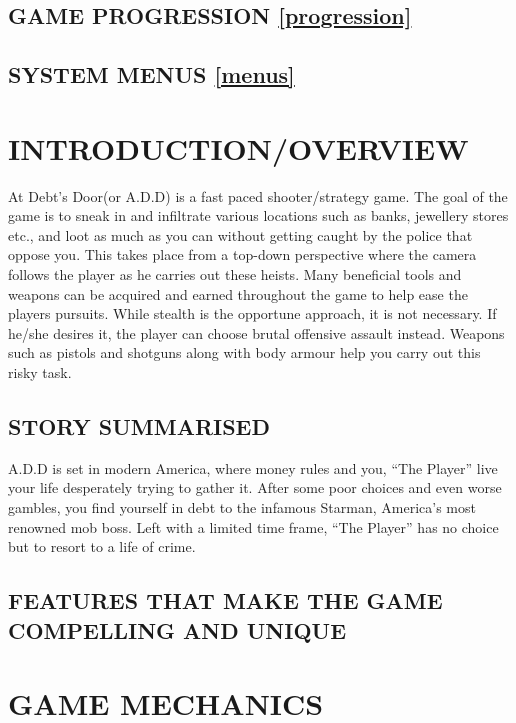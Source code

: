\documentclass{article}
\begin{document}
%

\subsection{GAME PROGRESSION \ref{progression}}

%

\subsection{SYSTEM MENUS \ref{menus}}


\section{INTRODUCTION/OVERVIEW \label{intro}}
At Debt’s Door(or A.D.D) is a fast paced shooter/strategy game. The goal of the game is to sneak in and infiltrate various locations such as banks, jewellery stores etc., and loot as much as you can without getting caught by the police that oppose you. This takes place from a top-down perspective where the camera follows the player as he carries out these heists. Many beneficial tools and weapons can be acquired and earned throughout the game to help ease the players pursuits.
\bigbreak
While stealth is the opportune approach, it is not necessary. If he/she desires it, the player can choose brutal offensive assault instead. Weapons such as pistols and shotguns along with body armour help you carry out this risky task.

\subsection{STORY SUMMARISED \label{storysumm}}
A.D.D is set in modern America, where money rules and you, “The Player” live your life desperately trying to gather it. After some poor choices and even worse gambles, you find yourself in debt to the infamous Starman, America’s most renowned mob boss. Left with a limited time frame, “The Player” has no choice but to resort to a life of crime.

\subsection{FEATURES THAT MAKE THE GAME COMPELLING AND UNIQUE \label{features}}

\section{GAME MECHANICS \label{mechanics}}
\end{document}

